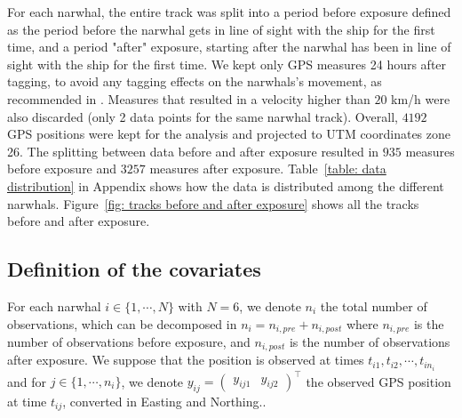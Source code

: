 \documentclass[11pt]{article}
\newcommand {\1}{\mathbb{1}}
\begin{document}
For each narwhal, the entire track was split into a period before exposure defined as the period before the narwhal gets in line of sight with the ship for the first time, and a period "after" exposure, starting after the narwhal has been in line of sight with the ship for the first time. We kept only GPS measures 24 
hours after tagging, to avoid any tagging effects on the narwhals's movement, as recommended in \cite{heide-jorgensen_behavioral_2021}.
Measures that resulted in a velocity higher than $20$ km/h were also discarded (only 2 data points for the same narwhal track).
Overall, $4192$ GPS positions were kept for the analysis and projected to UTM coordinates zone 26. The splitting between data before and after exposure resulted in $935$ measures before exposure and $3257$ measures after exposure. Table~\ref{table: data distribution} in Appendix shows how the data is distributed among the different narwhals. Figure~\ref{fig: tracks before and after exposure} shows all the tracks before and after exposure.


\subsection{Definition of the covariates}


For each narwhal $i \in \{1,\cdots,N\}$ with $N=6$, we denote $n_i$ the total number of observations, which can be decomposed in $n_i=n_{i,pre}+n_{i,post}$ where $n_{i,pre}$ is the number of observations before exposure, and $n_{i,post}$ is the number of observations after exposure. We suppose that the position is observed at times $t_{i1}, t_{i2}, \cdots,t_{in_i}$ and  for $j \in \{1,\cdots,n_i\}$, we denote $y_{ij}=\begin{pmatrix} y_{ij1} & y_{ij2} \end{pmatrix}^\top$ the observed GPS position at time $t_{ij}$, converted in Easting and Northing..
\end{document}
